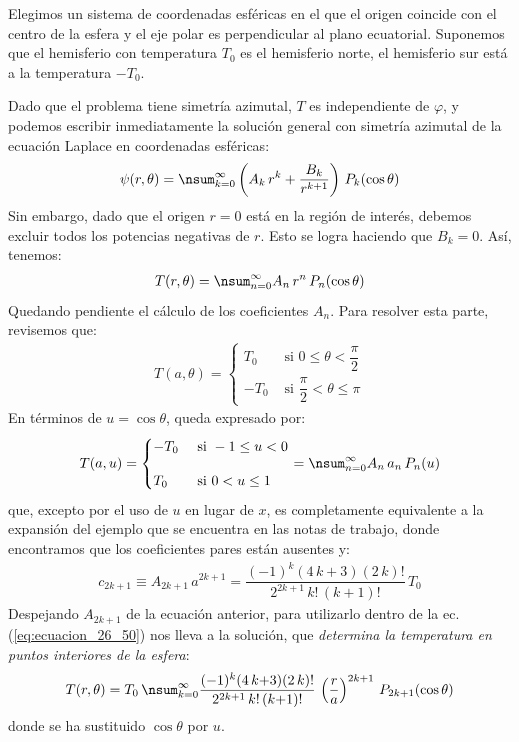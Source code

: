 Elegimos un sistema de coordenadas esféricas en el que el origen coincide con el centro de la esfera y el eje polar es perpendicular al plano ecuatorial. Suponemos que el hemisferio con temperatura $T_{0}$ es el hemisferio norte, el hemisferio sur está a la temperatura $-T_{0}$.
\par
Dado que el problema tiene simetría azimutal, $T$ es independiente de $\varphi$, y podemos escribir inmediatamente la solución general con simetría azimutal de la ecuación Laplace en coordenadas esféricas:
\begin{align*}
\psi (r, \theta) = \nsum_{k=0}^{\infty} \left( A_{k} \, r^{k} + \dfrac{B_{k}}{r^{k+1}} \right) \, P_{k} (\cos \theta)
\end{align*}
Sin embargo, dado que el origen $r = 0$ está en la región de interés, debemos excluir todos los potencias negativas de $r$.  Esto se logra haciendo que $B_{k} = 0$. Así, tenemos:
\begin{align}
T (r, \theta) = \nsum_{n=0}^{\infty} A_{n} \, r^{n} \, P_{n} (\cos \theta)
\label{eq:ecuacion_26_50}
\end{align}
Quedando pendiente el cálculo de los coeficientes $A_{n}$. Para resolver esta parte, revisemos que:
\begin{align*}
T (a, \theta) = \begin{cases}
T_{0} & \mbox{ si } 0 \leq \theta < \dfrac{\pi}{2} \\[1em]
-T_{0} & \mbox{ si } \dfrac{\pi}{2} < \theta \leq \pi
\end{cases}
\end{align*}
En términos de $u = \cos \theta$, queda expresado por:
\begin{align}
T (a, u) = \begin{cases}
-T_{0} & \mbox{ si } -1 \leq u < 0 \\[1em]
T_{0} & \mbox{ si } 0 < u \leq 1
\end{cases} = \nsum_{n=0}^{\infty} A_{n} \, a_{n} \, P_{n} (u)
\label{eq:ecuacion_26_51}
\end{align}
que, excepto por el uso de $u$ en lugar de $x$, es completamente equivalente a la expansión del ejemplo que se encuentra en las notas de trabajo, donde encontramos que los coeficientes pares están ausentes y:
\begin{align*}
c_{2k+1} \equiv A_{2k+1} \, a^{2k+1} = \dfrac{(-1)^{k} (4 \, k + 3)(2 \, k)!}{2^{2k+1} \, k! \, (k+1)!} \, T_{0}
\end{align*}
Despejando $A_{2k+1}$ de la ecuación anterior, para utilizarlo dentro de la ec. (\ref{eq:ecuacion_26_50}) nos lleva a la solución, que \emph{determina la temperatura en puntos interiores de la esfera}:
\begin{align}
T (r, \theta) = T_{0} \, \nsum_{k=0}^{\infty} \dfrac{(-1)^{k} (4 \, k {+} 3)(2 \, k)!}{2^{2k+1} \, k! \, (k {+} 1)!} \, \left( \dfrac{r}{a} \right)^{2k+1} \, P_{2k+1} (\cos \theta)
\label{eq:ecuacion_26_52}
\end{align}
donde se ha sustituido $\cos \theta$ por $u$.

